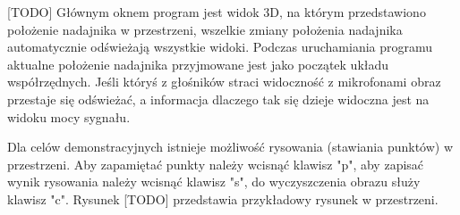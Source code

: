 [TODO]
Głównym oknem program jest widok 3D, na którym przedstawiono położenie nadajnika w przestrzeni,
wszelkie zmiany położenia nadajnika automatycznie odświeżają wszystkie widoki. Podczas uruchamiania programu
aktualne położenie nadajnika przyjmowane jest jako początek układu współrzędnych.
Jeśli któryś z głośników straci widoczność z mikrofonami obraz przestaje się odświeżać, a informacja dlaczego tak
się dzieje widoczna jest na widoku mocy sygnału.

Dla celów demonstracyjnych istnieje możliwość rysowania (stawiania punktów) w przestrzeni. Aby zapamiętać punkty
należy wcisnąć klawisz "p", aby zapisać wynik rysowania należy wcisnąć klawisz "s", do wyczyszczenia obrazu służy klawisz "c".
Rysunek [TODO] przedstawia przykładowy rysunek w przestrzeni.



